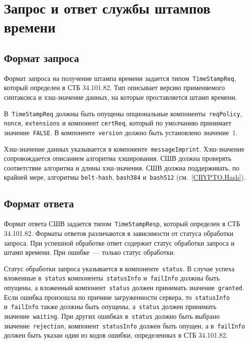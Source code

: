 \section{Запрос и ответ службы штампов времени}\label{FMT.TSP}

\subsection{Формат запроса}

Формат запроса на получение штампа времени задается 
типом~\texttt{TimeStampReq}, который определен 
в СТБ 34.101.82. Тип описывает версию применяемого синтаксиса и 
хэш-значение данных, на которые проставляется штамп времени.

В~\texttt{TimeStampReq} должны быть опущены опциональные 
компоненты~\texttt{reqPolicy}, \texttt{nonce}, \texttt{extensions} и компонент 
\texttt{certReq}, который по умолчанию принимает значение~\texttt{FALSE}. 
%
В компоненте~\texttt{version} должно быть установлено значение~$1$.

Хэш-значение данных указывается в компоненте~\texttt{messageImprint}.
Хэш-значение сопровождается описанием алгоритма хэширования.
СШВ должна проверять соответствие алгоритма и длины хэш-значения.
СШВ должна поддерживать, по крайней мере, алгоритмы \texttt{belt-hash},
\texttt{bash384} и~\texttt{bash512} (см.~\ref{CRYPTO.Hash}).

\subsection{Формат ответа}
 
Формат ответа СШВ задается типом~\texttt{TimeStampResp}, который определен 
в СТБ 34.101.82. Форматы ответов различаются в зависимости от статуса 
обработки запроса. При успешной обработке ответ содержит статус обработки 
запроса и штамп времени. При ошибке~--- только статус обработки.

Статус обработки запроса указывается в компоненте~\texttt{status}.
%
В случае успеха вложенные в~\texttt{status} компоненты~\texttt{statusInfo} 
и~\texttt{failInfo} должны быть опущены, а вложенный
компонент~\texttt{status} должен принимать значение~\texttt{granted}.
%
Если ошибка произошла по причине загруженности сервера, 
то~\texttt{statusInfo} и~\texttt{failInfo} также должны быть опущены, 
а~\texttt{status} должен принимать значение~\texttt{waiting}.
%
При других ошибках в~\texttt{status} должно быть выбрано 
значение~\texttt{rejection}, компонент~\texttt{statusInfo}
должен быть опущен, а в~\texttt{failInfo} должен быть указан один из 
кодов ошибки, определенных в СТБ 34.101.82.

